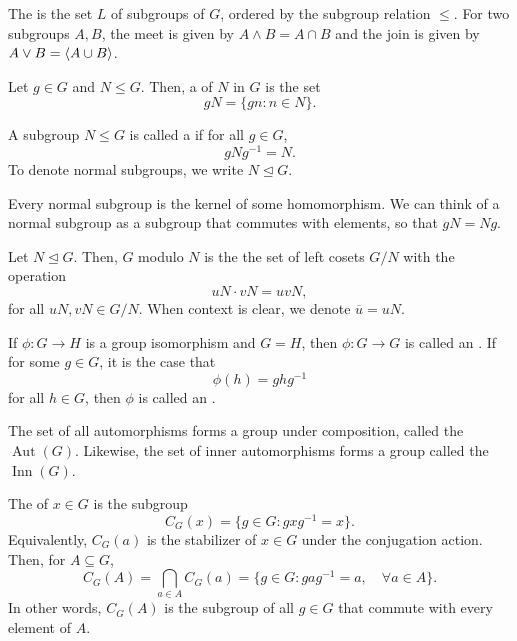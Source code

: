 \documentclass[class=report, crop=false]{standalone}
\begin{document}
\begin{definition}
    The  is the set $L$ of subgroups of $G$, ordered by the subgroup relation $\le$. For two subgroups $A,B$, the meet is given by $A\land B=A\cap B$ and the join is given by $A\lor B=\left\langle A\cup B\right\rangle$.
\end{definition}

\begin{definition}
    Let $g\in G$ and $N\le G$. Then, a  of $N$ in $G$ is the set
    \[gN = \{gn : n\in N\}.\]
\end{definition}

\begin{definition}
    A subgroup $N\le G$ is called a  if for all $g\in G$,
    \[gNg^{-1} = N.\]
    To denote normal subgroups, we write $N\trianglelefteq G$.

    Every normal subgroup is the kernel of some homomorphism. We can think of a normal subgroup as a subgroup that commutes with elements, so that $gN=Ng$.
\end{definition}

\begin{definition}
    Let $N\trianglelefteq G$. Then,  $G$ modulo $N$ is the the set of left cosets $G/N$ with the operation
    \[uN \cdot vN = uvN,\]
    for all $uN,vN\in G/N$. When context is clear, we denote $\overline{u} = uN$.
\end{definition}

\begin{definition}
    If $\phi: G\to H$ is a group isomorphism and $G=H$, then $\phi: G\to G$ is called an . If for some $g\in G$, it is the case that
    \[\phi(h)=ghg^{-1}\]
    for all $h\in G$, then $\phi$ is called an .

    The set of all automorphisms forms a group under composition, called the  $\operatorname{Aut}(G)$. Likewise, the set of inner automorphisms forms a group called the  $\operatorname{Inn}(G)$.
\end{definition}

\begin{definition}
    The  of $x\in G$ is the subgroup
    \[C_G(x) = \{g\in G: gxg^{-1} = x\}.\]
    Equivalently, $C_G(a)$ is the stabilizer of $x\in G$ under the conjugation action. Then, for $A\subseteq G$,
    \[C_G(A) = \bigcap_{a\in A} C_G(a) = \{g\in G: gag^{-1} = a, \quad \forall a\in A\}.\]
    In other words, $C_G(A)$ is the subgroup of all $g\in G$ that commute with every element of $A$.
\end{definition}
\end{document}
